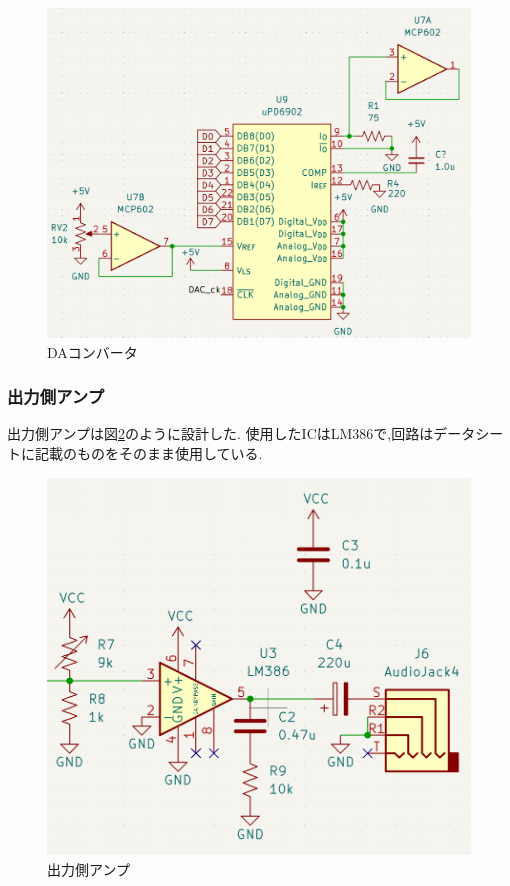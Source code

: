 \documentclass[a4paper,10pt]{article}
\begin{document}
\begin{multicols}{2}
\begin{figure}[H]
    \centering
    \includegraphics[width=\linewidth]{figure/dac.png} 
    \caption{DAコンバータ} 
    \label{fig:dac}
\end{figure}

\subsubsection{出力側アンプ}
出力側アンプは図\ref{fig:out_amp}のように設計した.
使用したICはLM386で,回路はデータシートに記載のものをそのまま使用している.

\begin{figure}[H]
    \centering
    \includegraphics[width=\linewidth]{figure/out_amp.png} 
    \caption{出力側アンプ} 
    \label{fig:out_amp}
\end{figure}


\end{multicols}
\end{document}
